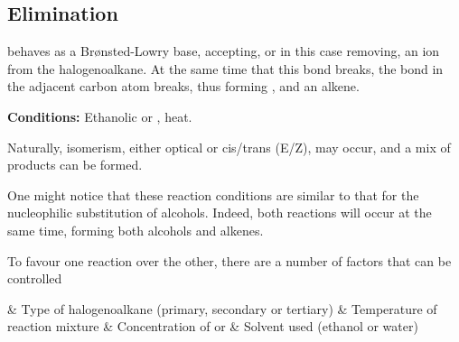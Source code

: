 




		\pagebreak
		\subsection{Elimination}

			 behaves as a Brønsted-Lowry base, accepting, or in this case removing, an  ion from the halogenoalkane.
			At the same time that this  bond breaks, the  bond in the adjacent carbon atom breaks, thus forming
			, and an alkene.

			\vspace{1.5em}
			\vbox{\textbf{Conditions:}	\tabto{35mm}Ethanolic  or , heat.}


			Naturally, isomerism, either optical or cis/trans (E/Z), may occur, and a mix of products can be formed.

			One might notice that these reaction conditions are similar to that for the nucleophilic substitution of alcohols. Indeed,
			both reactions will occur at the same time, forming both alcohols and alkenes.

			To favour one reaction over the other, there are a number of factors that can be controlled

			\begin{bulletlist}
				& Type of halogenoalkane (primary, secondary or tertiary)
				& Temperature of reaction mixture
				& Concentration of  or 
				& Solvent used (ethanol or water)
			\end{bulletlist}


